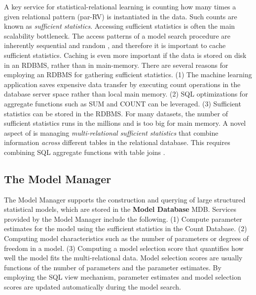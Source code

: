 \documentclass{article} %
\begin{document}
A key service for statistical-relational learning is counting how many times a given relational pattern (par-RV) is instantiated in the data. Such counts are known as {\em sufficient statistics}. 
Accessing sufficient statistics is often the main scalability bottleneck. The access patterns of a model search procedure are inherently sequential and random \cite{Niu2011}, and therefore it is important to cache sufficient statistics.  Caching is even more important if the data is stored on disk in an RDBMS, rather than in main-memory. 
%
There are several reasons for employing an RDBMS for gathering sufficient statistics. 
(1) The machine learning application saves expensive data transfer by executing count operations in the database server space rather than local main memory. (2) SQL optimizations for aggregate functions such as SUM and COUNT can be leveraged. (3) Sufficient statistics can be stored in the RDBMS. For many datasets, the number of sufficient statistics runs in the millions and is too big for main memory.  
%
A novel aspect of \FB is managing {\em multi-relational sufficient statistics} that combine information {\em across} different tables in the relational database. This requires combining SQL aggregate functions with table joins \cite{Qian2014a}. 
%
%
\subsection{The Model Manager} 
The Model Manager supports the construction and querying of large structured statistical models, which are stored in the \textbf{Model Database} MDB. Services provided by the Model Manager include the following. (1) Compute parameter estimates for the model using the sufficient statistics in the Count Database.  (2) Computing model characteristics such as the number of parameters or degrees of freedom in a model. (3) Computing a model selection score that quantifies how well the model fits the multi-relational data. 
Model selection scores are usually functions of the number of parameters and the parameter estimates.  By employing the SQL view mechanism, parameter estimates and model selection scores are updated automatically during the model search.
\end{document}
